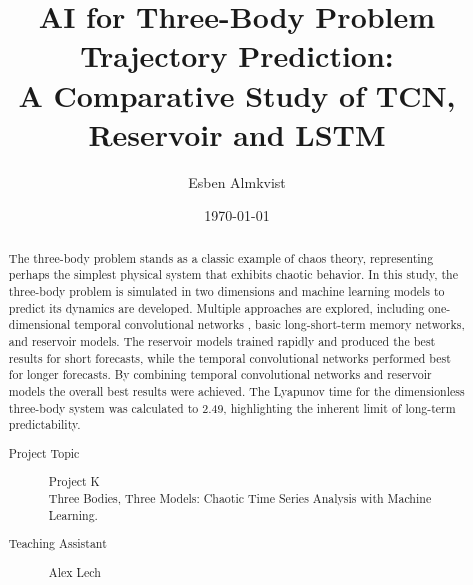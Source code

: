 \documentclass[%
 reprint,
 amsmath,amssymb,
 aps,
]{revtex4-2}
\begin{document}
\title{AI for Three-Body Problem Trajectory Prediction: \\
A Comparative Study of TCN, Reservoir and LSTM}

\author{Esben Almkvist}


\date{\today}%

\begin{abstract} %
\noindent The three-body problem stands as a classic example of chaos theory, representing perhaps the simplest physical system that exhibits chaotic behavior. In this study, the three-body problem is simulated in two dimensions and machine learning models to predict its dynamics are developed. Multiple approaches are explored, including one-dimensional temporal convolutional networks , basic long-short-term memory networks, and reservoir models. The reservoir models trained rapidly and produced the best results for short forecasts, while the temporal convolutional networks performed best for longer forecasts. By combining temporal convolutional networks and reservoir models the overall best results were achieved. The Lyapunov time for the dimensionless three-body system was calculated to 2.49, highlighting the inherent limit of long-term predictability.

\begin{description} %
\item[Project Topic] %
{Project K\\
Three Bodies, Three Models: Chaotic Time Series Analysis with Machine
Learning.} %
\item[Teaching Assistant] %
{Alex Lech} %
\end{description} %
\end{abstract}
\end{document}
